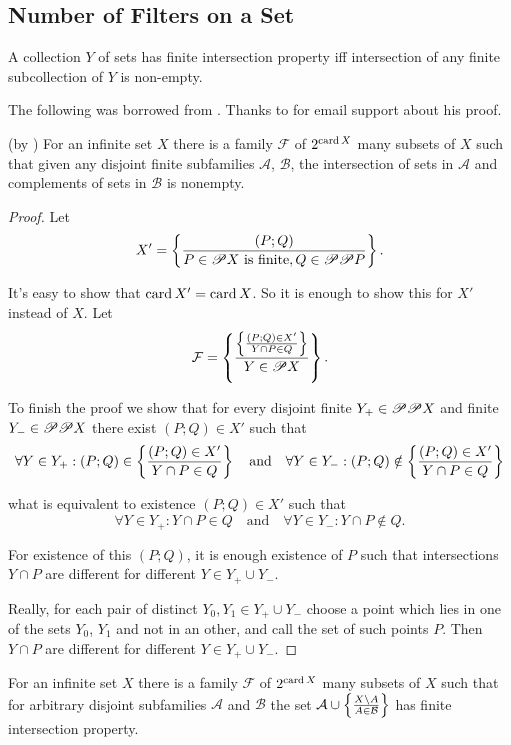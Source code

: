 \subsection{Number of Filters on a Set}
\begin{defn}
A collection $Y$ of sets has
finite intersection property iff intersection of any finite subcollection
of $Y$ is non-empty.
\end{defn}
The following was borrowed from \cite{blassnotesultra}. Thanks to
 for email support about his proof.
\begin{lem}
(by ) For an infinite set $X$ there is a family $\mathcal{F}$
of $2^{\operatorname{card} X}$ many subsets of $X$ such that given any disjoint
finite subfamilies $\mathcal{A}$, $\mathcal{B}$, the intersection
of sets in $\mathcal{A}$ and complements of sets in $\mathcal{B}$
is nonempty.\end{lem}
\begin{proof}
Let
\[
X'=\left\{ \frac{(P;Q)}{P\in\mathscr{P} X\text{ is finite},Q\in\mathscr{P}\mathscr{P} P}\right\}.
\]


It's easy to show that $\operatorname{card} X'=\operatorname{card} X$. So it is enough to show
this for $X'$ instead of $X$. Let
\[
\mathcal{F}=\left\{ \frac{\left\{ \frac{(P;Q)\in X'}{Y\cap P\in Q}\right\}}{Y\in\mathscr{P} X}\right\}.
\]


To finish the proof we show that for every disjoint finite $Y_{+}\in\mathscr{P}\mathscr{P} X$
and finite $Y_{-}\in\mathscr{P}\mathscr{P} X$ there exist $(P;Q)\in X'$
such that
\[
\forall Y\in Y_{+}:(P;Q)\in\left\{ \frac{(P;Q)\in X'}{Y\cap P\in Q}\right\}\quad\text{and}\quad\forall Y\in Y_{-}:(P;Q)\notin\left\{ \frac{(P;Q)\in X'}{Y\cap P\in Q}\right\}
\]


what is equivalent to existence $(P;Q)\in X'$ such that
\[
\forall Y\in Y_{+}:Y\cap P\in Q\quad\text{and}\quad\forall Y\in Y_{-}:Y\cap P\notin Q.
\]


For existence of this $(P;Q)$, it is enough existence of $P$ such
that intersections $Y\cap P$ are different for different $Y\in Y_{+}\cup Y_{-}$.

Really, for each pair of distinct $Y_{0},Y_{1}\in Y_{+}\cup Y_{-}$
choose a point which lies in one of the sets $Y_{0}$, $Y_{1}$ and
not in an other, and call the set of such points $P$. Then $Y\cap P$
are different for different $Y\in Y_{+}\cup Y_{-}$.\end{proof}
\begin{cor}
For an infinite set $X$ there is a family $\mathcal{F}$ of $2^{\operatorname{card} X}$
many subsets of $X$ such that for arbitrary disjoint subfamilies
$\mathcal{A}$ and $\mathcal{B}$ the set $\mathcal{A}\cup\left\{ \frac{X\setminus A}{A\in\mathcal{B}}\right\}$
has finite intersection property.\end{cor}
